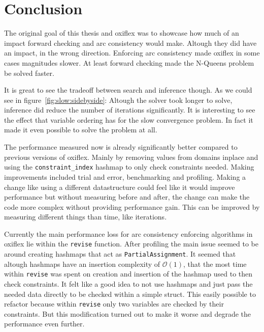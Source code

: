 
\chapter{Conclusion}

The original goal of this thesis and oxiflex was to showcase how much of an impact forward checking and arc consistency would make. Altough they did have an impact, in the wrong direction. Enforcing arc consistency made oxiflex in some cases magnitudes slower. At least forward checking made the N-Queens problem be solved faster.

It is great to see the tradeoff between search and inference though. As we could see in figure~\ref{fig:slow:sidebyside}: Altough the solver took longer to solve, inference did reduce the number of iterations significantly. It is interesting to see the effect that variable ordering has for the slow convergence problem. In fact it made it even possible to solve the problem at all.

The performance measured now is already significantly better compared to previous versions of oxiflex. Mainly by removing values from domains inplace and using the \verb|constraint_index| hashmap to only check constraints needed. Making improvements included trial and error, benchmarking and profiling. Making a change like using a different datastructure could feel like it would improve performance but without measuring before and after, the change can make the code more complex without providing performance gain. This can be improved by measuring different things than time, like iterations.

Currently the main performance loss for arc consistency enforcing algorithms in oxiflex lie within the \verb|revise| function. After profiling the main issue seemed to be around creating hashmaps that act as \verb|PartialAssignment|. It seemed that altough hashmaps have an insertion complexity of $\mathcal{O}(1)$, that the most time within \verb|revise| was spent on creation and insertion of the hashmap used to then check constraints. It felt like a good idea to not use hashmaps and just pass the needed data directly to be checked within a simple struct. This easily possible to refactor because within \verb|revise| only two variables are checked by their constraints. But this modification turned out to make it worse and degrade the performance even further.

